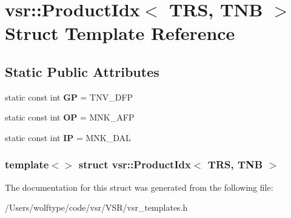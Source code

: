 \hypertarget{structvsr_1_1_product_idx_3_01_t_r_s_00_01_t_n_b_01_4}{\section{vsr\-:\-:Product\-Idx$<$ T\-R\-S, T\-N\-B $>$ Struct Template Reference}
\label{structvsr_1_1_product_idx_3_01_t_r_s_00_01_t_n_b_01_4}
}
\subsection*{Static Public Attributes}
\begin{DoxyCompactItemize}
\item 
\hypertarget{structvsr_1_1_product_idx_3_01_t_r_s_00_01_t_n_b_01_4_a92e1c4b7d51b8a1e24eb756bcdfa7c50}{static const int {\bfseries G\-P} = T\-N\-V\-\_\-\-D\-F\-P}\label{structvsr_1_1_product_idx_3_01_t_r_s_00_01_t_n_b_01_4_a92e1c4b7d51b8a1e24eb756bcdfa7c50}

\item 
\hypertarget{structvsr_1_1_product_idx_3_01_t_r_s_00_01_t_n_b_01_4_a88954b51c9872707b020dfa9df7a3b59}{static const int {\bfseries O\-P} = M\-N\-K\-\_\-\-A\-F\-P}\label{structvsr_1_1_product_idx_3_01_t_r_s_00_01_t_n_b_01_4_a88954b51c9872707b020dfa9df7a3b59}

\item 
\hypertarget{structvsr_1_1_product_idx_3_01_t_r_s_00_01_t_n_b_01_4_a56beedff14f6e6673ade57e8c6b2864e}{static const int {\bfseries I\-P} = M\-N\-K\-\_\-\-D\-A\-L}\label{structvsr_1_1_product_idx_3_01_t_r_s_00_01_t_n_b_01_4_a56beedff14f6e6673ade57e8c6b2864e}

\end{DoxyCompactItemize}
\subsubsection*{template$<$$>$ struct vsr\-::\-Product\-Idx$<$ T\-R\-S, T\-N\-B $>$}



The documentation for this struct was generated from the following file\-:\begin{DoxyCompactItemize}
\item 
/\-Users/wolftype/code/vsr/\-V\-S\-R/vsr\-\_\-templates.\-h\end{DoxyCompactItemize}
